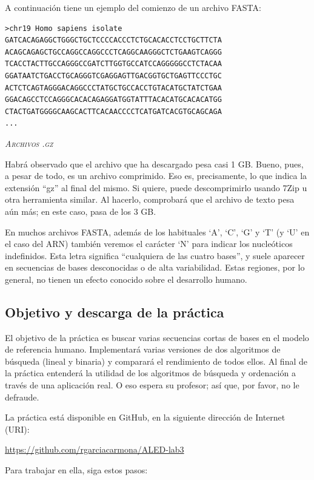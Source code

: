 \documentclass[10pt,a4paper,spanish]{article}
\newcommand{\sombreado}[2]{
  \begin{shaded}
    \begin{center} \emph{\textsc{#1}} \end{center}
    \noindent #2\\
  \end{shaded}
}
\begin{document}
A continuación tiene un ejemplo del comienzo de un archivo FASTA:

\begin{verbatim}
>chr19 Homo sapiens isolate
GATCACAGAGGCTGGGCTGCTCCCCACCCTCTGCACACCTCCTGCTTCTA
ACAGCAGAGCTGCCAGGCCAGGCCCTCAGGCAAGGGCTCTGAAGTCAGGG
TCACCTACTTGCCAGGGCCGATCTTGGTGCCATCCAGGGGGCCTCTACAA
GGATAATCTGACCTGCAGGGTCGAGGAGTTGACGGTGCTGAGTTCCCTGC
ACTCTCAGTAGGGACAGGCCCTATGCTGCCACCTGTACATGCTATCTGAA
GGACAGCCTCCAGGGCACACAGAGGATGGTATTTACACATGCACACATGG
CTACTGATGGGGCAAGCACTTCACAACCCCTCATGATCACGTGCAGCAGA
...
\end{verbatim}

\sombreado{Archivos .gz}{Habrá observado que el archivo que ha descargado pesa casi 1 GB. Bueno, pues, a pesar de todo, es un archivo comprimido. Eso es, precisamente, lo que indica la extensión ``gz'' al final del mismo. Si quiere, puede descomprimirlo usando 7Zip u otra herramienta similar. Al hacerlo, comprobará que el archivo de texto pesa aún más; en este caso, pasa de los 3 GB.}

En muchos archivos FASTA, además de los habituales `A', `C', `G' y `T' (y `U' en el caso del ARN) también veremos el carácter `N' para indicar los nucleóticos indefinidos. Esta letra significa ``cualquiera de las cuatro bases'', y suele aparecer en secuencias de bases desconocidas o de alta variabilidad. Estas regiones, por lo general, no tienen un efecto conocido sobre el desarrollo humano.

\subsection{Objetivo y descarga de la práctica}

El objetivo de la práctica es buscar varias secuencias cortas de bases en el modelo de referencia humano. Implementará varias versiones de dos algoritmos de búsqueda (lineal y binaria) y comparará el rendimiento de todos ellos. Al final de la práctica entenderá la utilidad de los algoritmos de búsqueda y ordenación a través de una aplicación real. O eso espera su profesor; así que, por favor, no le defraude.

La práctica está disponible en GitHub, en la siguiente dirección de Internet (URI):

\href{https://github.com/rgarciacarmona/ALED-lab3}{https://github.com/rgarciacarmona/ALED-lab3}

Para trabajar en ella, siga estos pasos:
\end{document}
